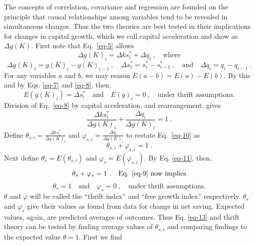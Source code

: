 \documentclass[a4paper,fleqn]{latex_styles/cas-sc}
\begin{document}
The concepts of correlation, covariance and regression are founded on the principle that causal relationships among variables tend to be revealed in simultaneous changes. Thus the two theories are best tested in their
implications for changes in capital growth, which we call capital acceleration and show as $\Delta g(K)$. First note that Eq.~\eqref{eq-5} allows
%
\begin{equation}
\Delta g{(K)}_{i} = \Delta k s^{*}_{i} + \Delta q_{i}\ , \quad \text{where}\label{eq-8}
\end{equation}
%
\[\Delta g{(K)}_{i} = g{(K)}_{i} - g(K)_{i - 1} \ , \quad
\Delta s^{*}_{i} = s^{*}_{i} - s^{*}_{i - 1} \ , \quad \text{and} \quad
\Delta q_{i} = q_{i} - q_{i - 1} \ .\]
%
For any variables \(a\) and \(b\), we may reason
\(E(a - b) = E(a) - E(b)\). By this and by Eqs. \eqref{eq-7} and
\eqref{eq-8}, then,
%
\begin{equation}
    E(g(K)_i) = \Delta s^*_i \quad \text{and} \quad E(q)_i = 0\ , \quad \text{under thrift assumptions.}\label{eq-9}
\end{equation}
%
Division of Eq.~\eqref{eq-8} by capital acceleration, and rearrangement,
gives
%
\begin{equation}
\frac{\Delta k s^{*}_{i}}{\Delta g{(K)}_{i}} + \frac{\Delta q_{i}}{\Delta g{(K)}_{i}} = 1 \ .\label{eq-10}
\end{equation}
%
Define \(\theta_{s,i} = \frac{\Delta k s^{*}_{i}}{\Delta g{(K)}_{i}}\)
and \(\varphi_{s,i} = \frac{\Delta q_{i}}{\Delta g{(K)}_{i}}\) to
restate Eq.~\eqref{eq-10} as
%
\begin{equation}
\theta_{s,i} + \varphi_{s,i} = 1 \ .\label{eq-11}
\end{equation}
%
Next define \(\theta_s = E(\theta_{s,i})\) and \(\varphi_s = E(\varphi_{s,i})\). By Eq. \eqref{eq-11}, then,
%
\begin{equation}%
    \theta_s + \varphi_s = 1 \ . \quad \text{Eq. \eqref{eq-9} now implies}%
    \label{eq-12}%
\end{equation}%
%
\vspace{-5ex}%
%
\begin{equation}%
    \theta_s = 1 \quad \text{and} \quad \varphi_s = 0 \ , \quad \text{under thrift assumptions.}%
    \label{eq-13}%
\end{equation}%
%
\(\theta\) and \(\varphi\) will be called the ``thrift index'' and
``free growth index'' respectively. \(\theta_{s}\) and
\(\varphi_{s}\) give their values as found from data for change in net
saving. 
%
Expected values, again, are predicted averages of outcomes. Thus Eq. \eqref{eq-13} and thrift theory can be tested by finding average values of \(\theta_{s,i}\) and comparing findings to the expected value \(\theta = 1\). First we find
\end{document}
